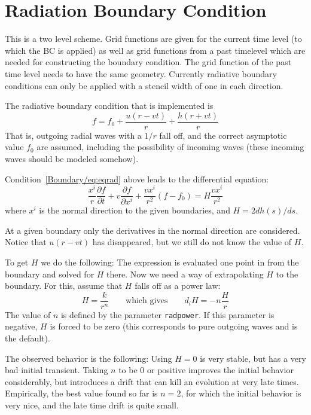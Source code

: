 \documentclass{article}
\begin{document}
\section{Radiation Boundary Condition}

This is a two level scheme. Grid functions are given for the current time 
level (to which the BC is applied) as well as grid functions from a past
timelevel which are needed for constructing the boundary condition.
The grid function of the past time level needs to have the same
geometry. 
Currently radiative boundary
conditions can only be applied with a stencil width of one in each
direction. 

The radiative boundary condition that is implemented is
\begin{equation}
\label{Boundary/eq:eqrad}
f = f_0 + \frac{u(r-vt)}{r}+\frac{h(r+vt)}{r}
\end{equation}
That is, outgoing radial waves with a $1/r$
fall off, and the correct asymptotic value $f_0$ are assumed, including
the possibility of incoming waves
(these incoming waves should be modeled somehow).

Condition~\ref{Boundary/eq:eqrad} above leads to the differential equation:
\begin{equation}
\frac{x^i}{r}\frac{\partial f}{\partial t}
+ v \frac{\partial f}{\partial x^i}
+\frac{v x^i}{r^2} (f-f_0)
= H \frac{v x^i}{r^2}  
\end{equation}
where $x^i$ is the normal direction to the given boundaries,
and $H = 2 dh(s)/ds$.

At a given boundary only the derivatives in the normal direction are 
considered.  Notice that $u(r-vt)$ has disappeared, but we still do 
not know the value of $H$.

To get $H$ we do the following:  The expression is evaluated one 
point in from the boundary and solved for $H$ there. Now we need a way of 
extrapolating $H$ to the boundary. For this, assume that 
$H$ falls off as a power law:
\begin{equation}
H = \frac{k}{r^n} \qquad \mbox{which gives} \qquad d_i H  =  - n \frac{H}{r}
\end{equation}
The value of $n$ is defined by the parameter {\tt radpower}.
If this parameter is negative, $H$ is forced to be zero (this
corresponds to pure outgoing waves and is the default).

The observed behavior is the following:  Using $H=0$
is very stable, but has a very bad initial transient. Taking
$n$ to be 0 or positive improves the initial behavior considerably,
but introduces a drift that can kill an evolution at very late
times.  Empirically, the best value found so far is $n=2$, for
which the initial behavior is very nice, and the late time drift 
is quite small.
\end{document}
